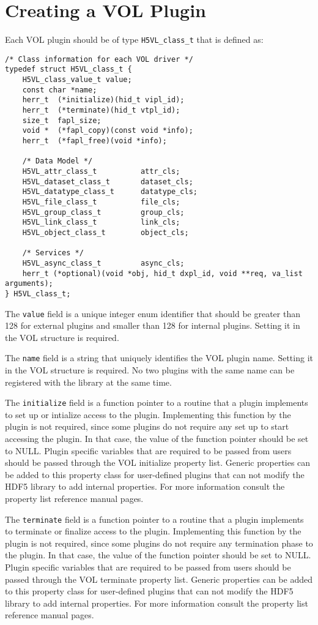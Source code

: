 \section{Creating a VOL Plugin}
\label{sec:vol}
Each VOL plugin should be of type {\tt H5VL\_class\_t} that is defined
as:

\begin{lstlisting}
/* Class information for each VOL driver */
typedef struct H5VL_class_t {
    H5VL_class_value_t value;
    const char *name;
    herr_t  (*initialize)(hid_t vipl_id);
    herr_t  (*terminate)(hid_t vtpl_id);
    size_t  fapl_size;
    void *  (*fapl_copy)(const void *info);
    herr_t  (*fapl_free)(void *info);

    /* Data Model */
    H5VL_attr_class_t          attr_cls;
    H5VL_dataset_class_t       dataset_cls;
    H5VL_datatype_class_t      datatype_cls;
    H5VL_file_class_t          file_cls;
    H5VL_group_class_t         group_cls;
    H5VL_link_class_t          link_cls;
    H5VL_object_class_t        object_cls;

    /* Services */
    H5VL_async_class_t         async_cls;
    herr_t (*optional)(void *obj, hid_t dxpl_id, void **req, va_list arguments);
} H5VL_class_t;
\end{lstlisting}

The {\tt value} field is a unique integer enum identifier that should be
greater than 128 for external plugins and smaller than 128 for
internal plugins. Setting it in the VOL structure is required.

The {\tt name} field is a string that uniquely identifies the VOL plugin
name. Setting it in the VOL structure is required. No two plugins with the same name can be registered with the library at the same time.

The {\tt initialize} field is a function pointer to a routine that a plugin implements to set up or intialize access to the plugin. Implementing this function by the plugin is not required, since some plugins do not require any set up to start accessing the plugin. In that case, the value of the function pointer should be set to NULL. Plugin specific variables that are required to be passed from users should be passed through the VOL initialize property list. Generic properties can be added to this property class for user-defined plugins that can not modify the HDF5 library to add internal properties. For more information consult the property list reference manual pages.

The {\tt terminate} field is a function pointer to a routine that a plugin implements to terminate or finalize access to the plugin. Implementing this function by the plugin is not required, since some plugins do not require any termination phase to the plugin. In that case, the value of the function pointer should be set to NULL. Plugin specific variables that are required to be passed from users should be passed through the VOL terminate property list. Generic properties can be added to this property class for user-defined plugins that can not modify the HDF5 library to add internal properties. For more information consult the property list reference manual pages.

